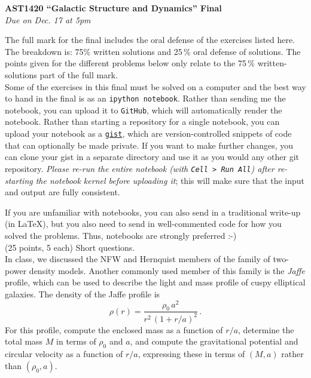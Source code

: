 \documentclass[12pt]{article}
\begin{document}
\begin{center}
{\bf \LARGE AST1420 ``Galactic Structure and Dynamics'' Final}\\[7pt]
\emph{Due on Dec. 17 at 5pm}\\[7pt]
\end{center}

The full mark for the final includes the oral defense of the exercises
listed here. The breakdown is: 75\% written solutions and 25\,\% oral
defense of solutions. The points given for the different problems
below only relate to the 75\,\% written-solutions part of the full
mark.\\

Some of the exercises in this final must be solved on a computer and
the best way to hand in the final is as an \texttt{ipython
  notebook}. Rather than sending me the notebook, you can upload it to
\texttt{GitHub}, which will automatically render the notebook. Rather
than starting a repository for a single notebook, you can upload your
notebook as a \texttt{\href{https://gist.github.com/}{gist}}, which
are version-controlled snippets of code that can optionally be made
private. If you want to make further changes, you can clone your gist
in a separate directory and use it as you would any other git
repository. \emph{Please re-run the entire notebook (with \texttt{Cell
    > Run All}) after re-starting the notebook kernel before uploading
  it}; this will make sure that the input and output are fully
consistent.

If you are unfamiliar with notebooks, you can also send in a
traditional write-up (in LaTeX), but you also need to send in
well-commented code for how you solved the problems. Thus, notebooks
are strongly preferred :-)\\

 (25 points, 5 each) Short questions.\\

 In class, we discussed the NFW and Hernquist members of the family of two-power density models. Another commonly used member of this family is the \emph{Jaffe} profile, which can be used to describe the light and mass profile of cuspy elliptical galaxies. The density of the Jaffe profile is
\begin{equation}
  \rho(r) = \frac{\rho_0\,a^2}{r^2\,(1+r/a)^2}\,.
\end{equation}
For this profile, compute the enclosed mass as a function of $r/a$, determine the total mass $M$ in terms of $\rho_0$ and $a$, and compute the gravitational potential and circular velocity as a function of $r/a$, expressing these in terms of $(M,a)$ rather than $(\rho_0,a)$.\\
\end{document}
